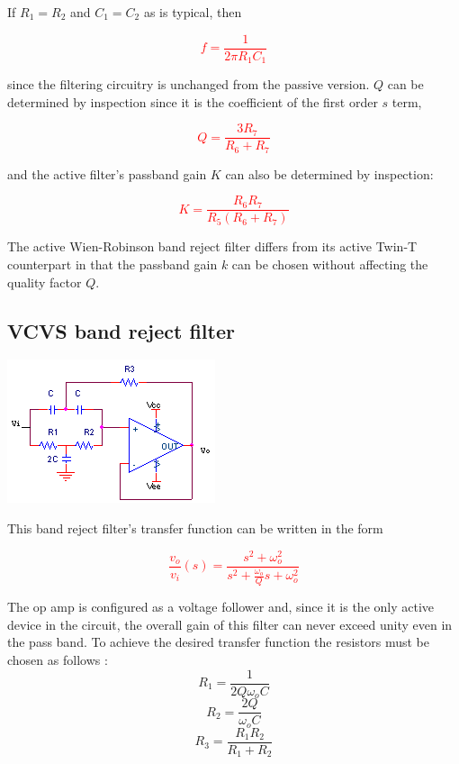 If $R_{1} = R_{2}$ and $C_{1} = C_{2}$ as is typical, then

\textcolor{red}{
\begin{equation}
f = \frac{1}{2\pi R_{1}C_{1}}
\end{equation}
}

since the filtering circuitry is unchanged from the passive version. $Q$ can be determined by inspection since it is the coefficient of the first order $s$ term,

\textcolor{red}{
\begin{equation}
Q = \frac{3R_{7}}{R_{6}+R_{7}}
\end{equation}
}

and the active filter's passband gain $K$ can also be determined by inspection:

\textcolor{red}{
\begin{equation}
K = \frac{R_{6}R_{7}}{R_{5}(R_{6}+R_{7})}
\end{equation}
}

The active Wien-Robinson band reject filter differs from its active Twin-T counterpart in that the passband gain $k$ can be chosen without affecting the quality factor $Q$.

\subsection{VCVS band reject filter}
\begin{center}
	\includegraphics{schematics/vcvs_bandreject.PNG}
\end{center}
This band reject filter's transfer function can be written in the form

\textcolor{red}{
\begin{equation}
\frac{v_{o}}{v_{i}}(s) = \frac{s^{2} + \omega_{o}^{2}}{s^{2} + \frac{\omega_{o}}{Q}s + \omega_{o}^{2}}
\label{eq:vcvs_bandreject}
\end{equation}
}

The op amp is configured as a voltage follower and, since it is the only active device in the circuit, the overall gain of this filter can never exceed unity even in the pass band.
To achieve the desired transfer function the resistors must be chosen as follows \autocite[145-146]{op-amp-circuits-johnson}:
\begin{equation}
R_1 = \frac{1}{2Q\omega_{o}C}
\end{equation}
\begin{equation}
R_2 = \frac{2Q}{\omega_{o}C}
\end{equation}
\begin{equation}
R_3 = \frac{R_1 R_2}{R_1 + R_2}
\end{equation}

